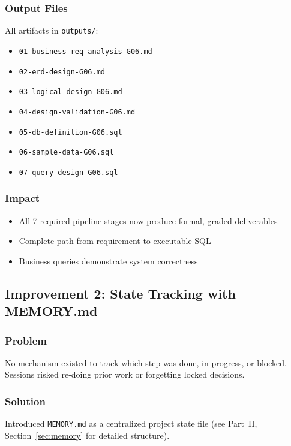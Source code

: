 \documentclass[12pt,a4paper]{article}
\begin{document}
\subsubsection{Output Files}
All artifacts in \texttt{outputs/}:
\begin{itemize}
    \item \texttt{01-business-req-analysis-G06.md}
    \item \texttt{02-erd-design-G06.md}
    \item \texttt{03-logical-design-G06.md}
    \item \texttt{04-design-validation-G06.md}
    \item \texttt{05-db-definition-G06.sql}
    \item \texttt{06-sample-data-G06.sql}
    \item \texttt{07-query-design-G06.sql}
\end{itemize}

\subsubsection{Impact}
\begin{itemize}
    \item All 7 required pipeline stages now produce formal, graded deliverables
    \item Complete path from requirement to executable SQL
    \item Business queries demonstrate system correctness
\end{itemize}

\subsection{Improvement 2: State Tracking with MEMORY.md}

\subsubsection{Problem}
No mechanism existed to track which step was done, in-progress, or blocked. Sessions risked re-doing prior work or forgetting locked decisions.

\subsubsection{Solution}
Introduced \texttt{MEMORY.md} as a centralized project state file (see Part~II, Section~\ref{sec:memory} for detailed structure).
\end{document}
